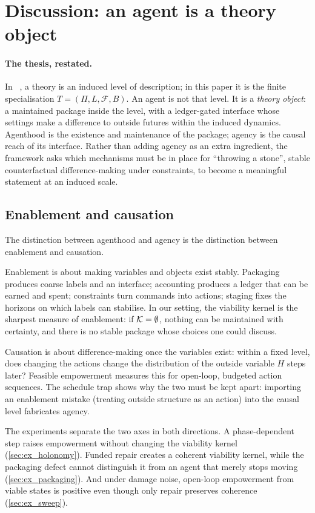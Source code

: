 \section{Discussion: an agent is a theory object}
\label{sec:discussion}

\paragraph{The thesis, restated.}
In \SBT\ \citep{six_birds_theory}, a theory is an induced level of description; in this paper it is the finite specialisation $T=(\Pi,L,\mathcal{F},B)$. An agent is not that level. It is a \emph{theory object}: a maintained package inside the level, with a ledger-gated interface whose settings make a difference to outside futures within the induced dynamics. Agenthood is the existence and maintenance of the package; agency is the causal reach of its interface. Rather than adding agency as an extra ingredient, the framework asks which mechanisms must be in place for ``throwing a stone'', stable counterfactual difference-making under constraints, to become a meaningful statement at an induced scale.

\subsection{Enablement and causation}
The distinction between agenthood and agency is the distinction between enablement and causation.

Enablement is about making variables and objects exist stably. Packaging produces coarse labels and an interface; accounting produces a ledger that can be earned and spent; constraints turn commands into actions; staging fixes the horizons on which labels can stabilise. In our setting, the viability kernel is the sharpest measure of enablement: if $\mathcal{K}=\emptyset$, nothing can be maintained with certainty, and there is no stable package whose choices one could discuss.

Causation is about difference-making once the variables exist: within a fixed level, does changing the actions change the distribution of the outside variable $H$ steps later? Feasible empowerment measures this for open-loop, budgeted action sequences. The schedule trap shows why the two must be kept apart: importing an enablement mistake (treating outside structure as an action) into the causal level fabricates agency.

The experiments separate the two axes in both directions. A phase-dependent step raises empowerment without changing the viability kernel (\cref{sec:ex_holonomy}). Funded repair creates a coherent viability kernel, while the packaging defect cannot distinguish it from an agent that merely stops moving (\cref{sec:ex_packaging}). And under damage noise, open-loop empowerment from viable states is positive even though only repair preserves coherence (\cref{sec:ex_sweep}).

